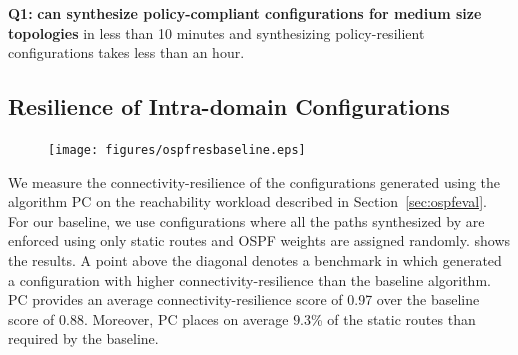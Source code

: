\textbf{Q1:} \textbf{\name can synthesize policy-compliant configurations for medium size topologies} in less than 10 minutes and synthesizing policy-resilient 
configurations takes less than an hour.



\subsection{Resilience of Intra-domain Configurations} \label{sec:reseval}

\begin{figure}
	\vspace{-6mm}
		\texttt{[image: figures/ospfresbaseline.eps]}
\end{figure}

We measure the connectivity-resilience of the configurations 
generated using the algorithm PC on the reachability 
workload described in
Section~\ref{sec:ospfeval}. 
For our baseline, we use configurations 
where all the paths synthesized by \genesis
are enforced using only static routes and
OSPF weights are assigned randomly.
shows the results. A point above the diagonal 
denotes a benchmark in which \name
generated a configuration with higher connectivity-resilience than
the baseline algorithm.
PC provides an average connectivity-resilience score 
of 0.97 over the baseline score 
of 0.88.
Moreover, PC places on average 
$9.3$\% of the static routes 
than required by the baseline. 


